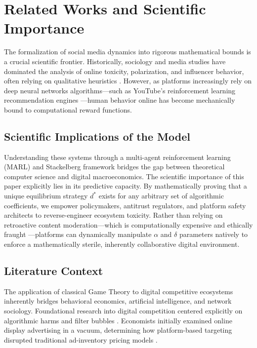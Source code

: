 \documentclass[12pt,letterpaper]{article}
\begin{document}
\section{Related Works and Scientific Importance}

The formalization of social media dynamics into rigorous mathematical bounds is a crucial scientific frontier. Historically, sociology and media studies have dominated the analysis of online toxicity, polarization, and influencer behavior, often relying on qualitative heuristics \cite{choi2023creatorfriendly}. However, as platforms increasingly rely on deep neural networks algorithms—such as YouTube's reinforcement learning recommendation engines \cite{covington2016deep}—human behavior online has become mechanically bound to computational reward functions.

\subsection{Scientific Implications of the Model}
Understanding these systems through a multi-agent reinforcement learning (MARL) and Stackelberg framework bridges the gap between theoretical computer science and digital macroeconomics. The scientific importance of this paper explicitly lies in its predictive capacity. By mathematically proving that a unique equilibrium strategy $d^*$ exists for any arbitrary set of algorithmic coefficients, we empower policymakers, antitrust regulators, and platform safety architects to reverse-engineer ecosystem toxicity. Rather than relying on retroactive content moderation—which is computationally expensive and ethically fraught \cite{gillespie2018custodians}—platforms can dynamically manipulate $\alpha$ and $\delta$ parameters natively to enforce a mathematically sterile, inherently collaborative digital environment. 

\subsection{Literature Context}
The application of classical Game Theory to digital competitive ecosystems inherently bridges behavioral economics, artificial intelligence, and network sociology. Foundational research into digital competition centered explicitly on algorithmic harms and filter bubbles \cite{tufekci2015, pariser2011filter}. Economists initially examined online display advertising in a vacuum, determining how platform-based targeting disrupted traditional ad-inventory pricing models \cite{goldfarb2011}. 
\end{document}
